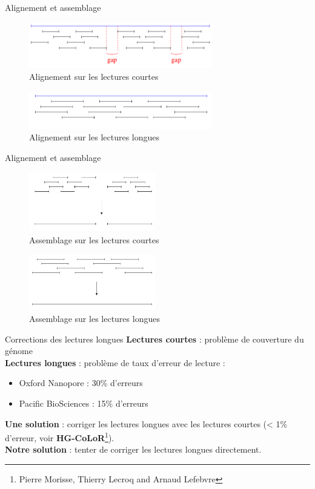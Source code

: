 \documentclass[11pt]{beamer}
\begin{document}
\begin{frame}[fragile]{Alignement et assemblage}
  \begin{figure}
    \includegraphics[width=80mm]{alignement_courts}
    \caption{Alignement sur les lectures courtes}
  \end{figure}
  \pause
  \begin{figure}
    \includegraphics[width=80mm]{alignement_longs}
    \caption{Alignement sur les lectures longues}
  \end{figure}
\end{frame}

\begin{frame}[fragile]{Alignement et assemblage}
  \begin{figure}
    \includegraphics[width=55mm]{assemblage_courts}
    \caption{Assemblage sur les lectures courtes}
  \end{figure}
  \pause
  \begin{figure}
    \includegraphics[width=55mm]{assemblage_longs}
    \caption{Assemblage sur les lectures longues}
  \end{figure}
\end{frame}

\begin{frame}[fragile]{Corrections des lectures longues}
  \textbf{Lectures courtes} : problème de couverture du génome\medskip\pause\\
  \textbf{Lectures longues} : problème de taux d'erreur de lecture :\pause
  \begin{itemize}[<+-| alert@+>]
    \item Oxford Nanopore : 30\% d'erreurs
    \item Pacific BioSciences : 15\% d'erreurs
  \end{itemize}\pause
  \textbf{Une solution} : corriger les lectures longues avec les lectures courtes (< 1\% d'erreur, voir \textbf{HG-CoLoR}\footnote{Pierre Morisse, Thierry Lecroq and Arnaud Lefebvre\cite{Morisse2017}}).\medskip\pause\\
  \textbf{Notre solution} : tenter de corriger les lectures longues directement.
\end{frame}
\end{document}
